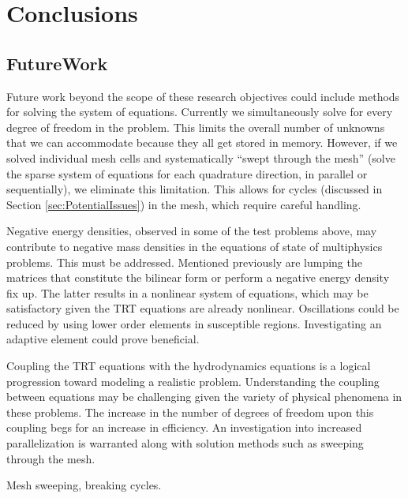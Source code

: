 \documentclass[12pt]{article}
\begin{document}
\section{Conclusions}
\label{sec:Conclusions}

\subsection{FutureWork}
\label{subsec:FutureWork}

Future work beyond the scope of these research objectives could include methods for solving the system of equations. Currently we simultaneously solve for every degree of freedom in the problem. This limits the overall number of unknowns that we can accommodate because they all get stored in memory. However, if we solved individual mesh cells and systematically ``swept through the mesh'' (solve the sparse system of equations for each quadrature direction, in parallel or sequentially), we eliminate this limitation. This allows for cycles (discussed in Section \ref{sec:PotentialIssues}) in the mesh, which require careful handling.

Negative energy densities, observed in some of the test problems above, may contribute to negative mass densities in the equations of state of multiphysics problems. This must be addressed. Mentioned previously are lumping the matrices that constitute the bilinear form or perform a negative energy density fix up. The latter results in a nonlinear system of equations, which may be satisfactory given the TRT equations are already nonlinear. Oscillations could be reduced by using lower order elements in susceptible regions. Investigating an adaptive element could prove beneficial.

Coupling the TRT equations with the hydrodynamics equations is a logical progression toward modeling a realistic problem. Understanding the coupling between equations may be challenging given the variety of physical phenomena in these problems. The increase in the number of degrees of freedom upon this coupling begs for an increase in efficiency. An investigation into increased parallelization is warranted along with solution methods such as sweeping through the mesh.

{\color{blue}
Mesh sweeping, breaking cycles.
}

%
%
\end{document}
